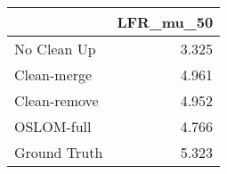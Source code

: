 \begin{tabular}{lr}
\toprule
{} & LFR_mu_50 \\
\midrule
No Clean Up  &     3.325 \\
Clean-merge  &     4.961 \\
Clean-remove &     4.952 \\
OSLOM-full   &     4.766 \\
Ground Truth &     5.323 \\
\bottomrule
\end{tabular}
